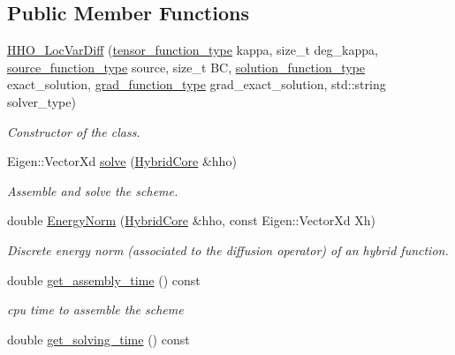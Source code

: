 \subsection*{Public Member Functions}
\begin{DoxyCompactItemize}
\item 
\hyperlink{group__HHO__LocVarDiff_ga498c8ed6193d76926ca3f3627ed6cf11}{H\+H\+O\+\_\+\+Loc\+Var\+Diff} (\hyperlink{classHArDCore3D_1_1HHO__LocVarDiff_aba48f23cd9e46ab3b0d7d907e0990bd6}{tensor\+\_\+function\+\_\+type} kappa, size\+\_\+t deg\+\_\+kappa, \hyperlink{classHArDCore3D_1_1HHO__LocVarDiff_a478a09a65f66428a614412e7d308ffcd}{source\+\_\+function\+\_\+type} source, size\+\_\+t BC, \hyperlink{classHArDCore3D_1_1HHO__LocVarDiff_a57cf83c67a9bcd71822a4ebdfbe0f0ce}{solution\+\_\+function\+\_\+type} exact\+\_\+solution, \hyperlink{classHArDCore3D_1_1HHO__LocVarDiff_a13003c1e92aab2a21e3055e2fd7104f8}{grad\+\_\+function\+\_\+type} grad\+\_\+exact\+\_\+solution, std\+::string solver\+\_\+type)
\begin{DoxyCompactList}\small\item\em Constructor of the class. \end{DoxyCompactList}\item 
Eigen\+::\+Vector\+Xd \hyperlink{group__HHO__LocVarDiff_gab01c6aad8ad6264f67f866ec26c8055d}{solve} (\hyperlink{classHArDCore3D_1_1HybridCore}{Hybrid\+Core} \&hho)
\begin{DoxyCompactList}\small\item\em Assemble and solve the scheme. \end{DoxyCompactList}\item 
double \hyperlink{group__HHO__LocVarDiff_gab04749bad041c0ed9e91c54f262d42e1}{Energy\+Norm} (\hyperlink{classHArDCore3D_1_1HybridCore}{Hybrid\+Core} \&hho, const Eigen\+::\+Vector\+Xd Xh)
\begin{DoxyCompactList}\small\item\em Discrete energy norm (associated to the diffusion operator) of an hybrid function. \end{DoxyCompactList}\item 
double \hyperlink{group__HHO__LocVarDiff_ga4232eab7b9753215b506d5ce701c4f4f}{get\+\_\+assembly\+\_\+time} () const
\begin{DoxyCompactList}\small\item\em cpu time to assemble the scheme \end{DoxyCompactList}\item 
double \hyperlink{group__HHO__LocVarDiff_ga10971b2952ab54d336127a43f5ed9b29}{get\+\_\+solving\+\_\+time} () const

\end{DoxyCompactItemize}
